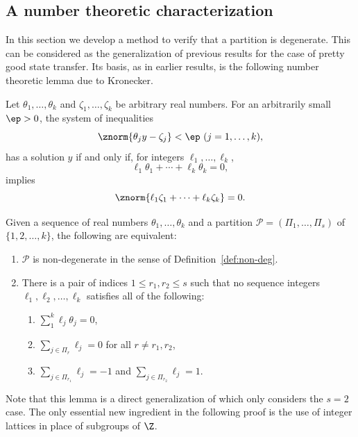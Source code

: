 \subsection{A number theoretic characterization}

In this section we develop a method to verify that a partition is degenerate. This can be considered as the generalization of previous results for the case of pretty good state transfer. Its basis, as in earlier results, is the following number theoretic lemma due to Kronecker.

\begin{lemma}[Kronecker]\label{lem:Kron}
Let $\theta_1,\ldots,\theta_k$ and $\zeta_1,\ldots,\zeta_k$ be arbitrary real numbers.  For an arbitrarily small $\ep > 0$, the system of inequalities
\[
\znorm{\theta_ j y - \zeta_j} < \ep \ (j=1,\ldots,k),
\]
has a solution $y$ if and only if, for integers $\ell_1,\ldots,\ell_k$, 
\[
\ell_1\theta_1+\cdots+\ell_k\theta_k = 0,
\]
implies
\[
\znorm{\ell_1\zeta_1 + \cdots + \ell_k\zeta_k}= 0.
\]
\end{lemma}


\begin{lemma}\label{thm:kronecker}
Given a sequence of real numbers $\theta_1, \dots, \theta_k$ and a partition $\mathcal{P} = (\Pi_1,\dots,\Pi_s)$ of $\{1,2,\dots, k\}$, the following are equivalent:
\begin{enumerate}[label=\roman*)]
\item $\mathcal{P}$ is non-degenerate in the sense of Definition~\ref{def:non-deg}.
\item There is a pair of indices $1 \leq r_1, r_2 \leq s$ such that no sequence integers $\ell_1, \ell_2, \dots, \ell_k$ satisfies all of the following:
\begin{enumerate}[label=\alph*)]
\item $\sum_1^k \ell_j \theta_j = 0$,
\item $\sum_{j\in\Pi_r}\ell_j=0$ for all $r \neq r_1,r_2$,
\item $\sum_{j\in\Pi_{r_1}}\ell_j=-1$ and  $\sum_{j\in\Pi_{r_2}}\ell_j=1$.
\end{enumerate}

\end{enumerate}
\end{lemma}

\begin{rema}
Note that this lemma is a direct generalization of \cite[Theorem 2.4]{chan2020approximate} which only considers the $s=2$ case. The only essential new ingredient in the following proof is the use of integer lattices in place of subgroups of $\Z$.
\end{rema}


